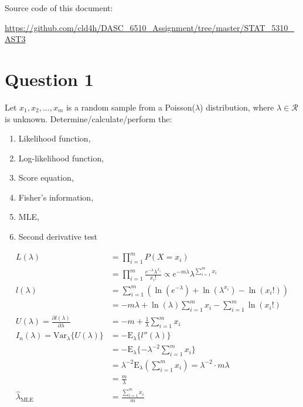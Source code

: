 \documentclass[11pt]{article}
\newcommand{\handout}[5]{
   \renewcommand{\thepage}{#1-\arabic{page}}
   \noindent
   \begin{center}
   \framebox{
      \vbox{
    \hbox to 5.78in { {\bf STAT 5310} \hfill #2 }
       \vspace{4mm}
       \hbox to 5.78in { {\Large \hfill #5  \hfill} }
       \vspace{2mm}
       \hbox to 5.78in { {\it #3 \hfill #4} }
      }
   }
   \end{center}
   \vspace*{4mm}
}
\newcommand{\ho}[5]{\handout{#1}{#2}{Instructor:
#3}{Scribe: #4}{Assignment #1: #5}}
\newcommand{\prob}[1]{
\begin{tcolorbox}[colback=green!5!white,colframe=green!75!black]
#1
\end{tcolorbox}
}
\begin{document}
Source code of this document:

\url{https://github.com/cld4h/DASC_6510_Assignment/tree/master/STAT_5310_AST3}

\section{Question 1}
\prob{
Let $x_1, x_2, \ldots, x_m$ is a random sample from a Poisson($\lambda$) distribution, where $\lambda \in \mathcal{R}$ is unknown. Determine/calculate/perform the:
\begin{multicols}{2}
\begin{enumerate}
\item Likelihood function, \item Log-likelihood function, \item Score equation, \item Fisher’s information, \item MLE, \item Second derivative test
\end{enumerate}
\end{multicols}
}

\begin{align*}
L(\lambda)
&= \prod_{i=1}^m P(X=x_i)\\
&= \prod_{i=1}^m \frac{e^{-\lambda}\lambda^{x_i}}{x_i!} \propto e^{-m\lambda} \lambda^{\sum_{i=1}^{m} x_i}\\
l(\lambda)
&= \sum_{i=1}^{m} \left( \ln\left( e^{-\lambda} \right) +\ln\left(  \lambda^{x_i} \right) - \ln\left( x_{i}! \right) \right) \\
&=  -m\lambda + \ln(\lambda)\sum_{i=1}^{m} x_{i} - \sum_{i=1}^{m}\ln\left( x_{i}! \right)\\
U(\lambda)=\frac{\partial l(\lambda)}{\partial \lambda}
&=-m+\frac{1}{\lambda}\sum_{i=1}^{m} x_{i}\\
I_n(\lambda) = \text{Var}_{\lambda}\{U(\lambda)\} 
&= -\text{E}_{\lambda}\{l''\left( \lambda \right) \} \\
&= -\text{E}_{\lambda}\{-\lambda^{-2}\sum_{i=1}^{m} x_{i}\}\\
&=\lambda^{-2} \text{E}_{\lambda}\left( \sum_{i=1}^{m} x_i \right) =\lambda^{-2}\cdot m \lambda\\
&= \frac{m}{\lambda}\\
\hat{\lambda}_\text{MLE} &= \frac{\sum_{i=1}^{m} x_{i}}{m}\\
\end{align*}
\end{document}
